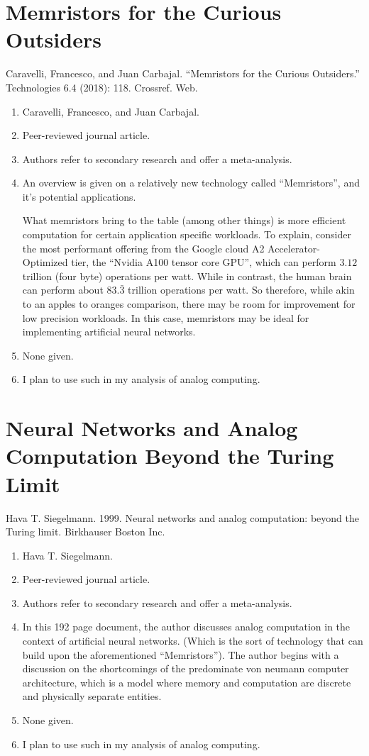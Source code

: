 \section*{Memristors for the Curious Outsiders}
Caravelli, Francesco, and Juan Carbajal. “Memristors for the Curious Outsiders.” Technologies 6.4 (2018): 118. Crossref. Web.
\begin{enumerate}
    \item Caravelli, Francesco, and Juan Carbajal.
    \item Peer-reviewed journal article.
    \item Authors refer to secondary research and offer a meta-analysis.
    \item An overview is given on a relatively new technology called ``Memristors'', and it's potential applications.
    
    What memristors bring to the table (among other things) is more efficient computation for certain application specific workloads. To explain, consider the most performant offering from the Google cloud A2 Accelerator-Optimized tier, the ``Nvidia A100 tensor core GPU'', which can perform $3.12$ trillion (four byte) operations per watt. While in contrast, the human brain can perform about $83.\bar{3}$ trillion operations per watt. So therefore, while akin to an apples to oranges comparison, there may be room for improvement for low precision workloads. In this case, memristors may be ideal for implementing artificial neural networks.
        \item None given. 
    \item I plan to use such in my analysis of analog computing. 
\end{enumerate}



\section*{Neural Networks and Analog Computation Beyond the Turing Limit}
Hava T. Siegelmann. 1999. Neural networks and analog computation: beyond the Turing limit. Birkhauser Boston Inc.
\begin{enumerate}
    \item Hava T. Siegelmann.
    \item Peer-reviewed journal article.
    \item Authors refer to secondary research and offer a meta-analysis.
    \item In this 192 page document, the author discusses analog computation in the context of artificial neural networks. (Which is the sort of technology that can build upon the aforementioned ``Memristors''). The author begins with a discussion on the shortcomings of the predominate von neumann computer architecture, which is a model where memory and computation are discrete and physically separate entities. 
    \item None given. 
    \item I plan to use such in my analysis of analog computing. 
\end{enumerate}

